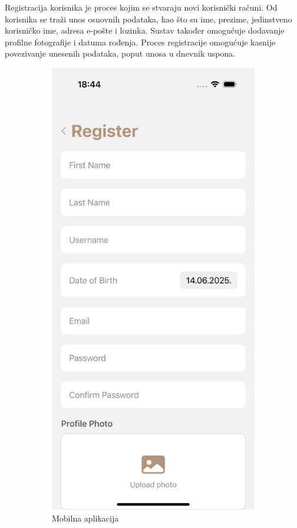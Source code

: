 Registracija korisnika je proces kojim se stvaraju novi korisnički računi. Od korisnika se traži unos osnovnih podataka, kao što su ime, prezime, jedinstveno korisničko ime, adresa e-pošte i lozinka. Sustav također omogućuje dodavanje profilne fotografije i datuma rođenja. Proces registracije omogućuje kasnije povezivanje unesenih podataka, poput unosa u dnevnik uspona.

\begin{figure}[H]
\centering
\begin{subfigure}{.5\textwidth}
  \centering
  \includegraphics[width=0.7\linewidth]{images/implementacija/register.png}
  \caption{Mobilna aplikacija}
  \label{fig:registracija1}
\end{subfigure}%
\begin{subfigure}{.5\textwidth}

\end{subfigure}
\end{figure}
